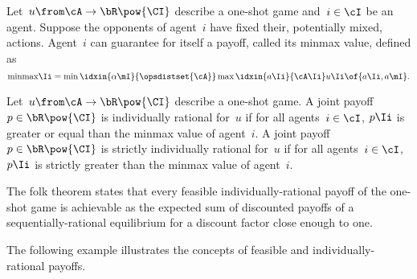 \begin{definition}
Let~\(u \from \cA \to \bR\pow{\CI}\) describe a one-shot game and~\(i \in \cI\) be an agent.
Suppose the opponents of agent~\(i\) have fixed their, potentially mixed, actions.
Agent~\(i\) can guarantee for itself a payoff, called its minmax value, defined as
\[
\mathrm{minmax}\Ii = \min\idxin{\alpha\mI}{\opsdistset{\cA}} \max\idxin{a\Ii}{\cA\Ii} u\Ii \of {a\Ii, a\mI}.
\]
\end{definition}

\begin{definition}
Let~\(u \from \cA \to \bR\pow{\CI}\) describe a one-shot game.
A joint payoff~\(p \in \bR \pow{\CI}\) is individually rational for~\(u\) if for all agents~\(i \in \cI\), \(p\Ii\) is greater or equal than the minmax value of agent~\(i\).
A joint payoff~\(p \in \bR \pow{\CI}\) is strictly individually rational for~\(u\) if for all agents~\(i \in \cI\), \(p\Ii\) is strictly greater than the minmax value of agent~\(i\).
\end{definition}

The folk theorem states that every feasible individually-rational payoff of the one-shot game is achievable as the expected sum of discounted payoffs of a sequentially-rational equilibrium for a discount factor close enough to one.

The following example illustrates the concepts of feasible and individually-rational payoffs.

